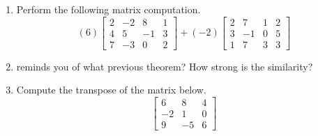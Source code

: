 \begin{enumerate}
%
\item Perform the following matrix computation.
\begin{equation*}
(6)
\begin{bmatrix}
2 & -2 & 8 & 1 \\
4 & 5 & -1 & 3\\
7 & -3 & 0 & 2
\end{bmatrix}
+
(-2)
\begin{bmatrix}
2 & 7 & 1 & 2\\
3 & -1 & 0 & 5\\
1 & 7 & 3 & 3
\end{bmatrix}
\end{equation*}
%
\item  {} reminds you of what previous theorem? How strong is the similarity?
%
\item Compute the transpose of the matrix below.
%
\begin{equation*}
\begin{bmatrix}
6 & 8 & 4 \\
-2 & 1 & 0 \\
9 & -5 & 6 
\end{bmatrix}
\end{equation*}
%
\end{enumerate}